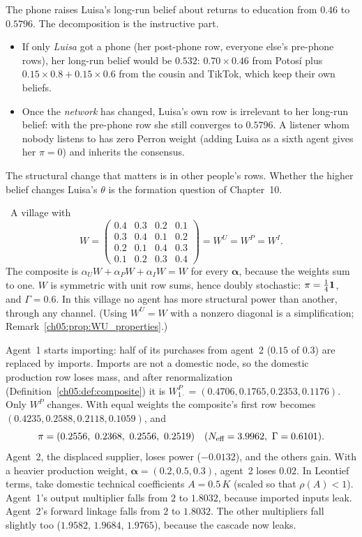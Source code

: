 \documentclass[../solutions_manual.tex]{subfiles}
\begin{document}
 The phone raises Luisa's long-run belief about returns to education from $0.46$ to $0.5796$. The decomposition is the instructive part.
\begin{itemize}
\item If only \emph{Luisa} got a phone (her post-phone row, everyone else's pre-phone rows), her long-run belief would be $0.532$: $0.70\times0.46$ from Potos\'i plus $0.15\times0.8 + 0.15\times0.6$ from the cousin and TikTok, which keep their own beliefs.
\item Once the \emph{network} has changed, Luisa's own row is irrelevant to her long-run belief: with the pre-phone row she still converges to $0.5796$. A listener whom nobody listens to has zero Perron weight (adding Luisa as a sixth agent gives her $\pi = 0$) and inherits the consensus.
\end{itemize}
The structural change that matters is in other people's rows. Whether the higher belief changes Luisa's $\theta$ is the formation question of Chapter~10.


 \illustrative\ A village with
\[
W = \begin{pmatrix} 0.4 & 0.3 & 0.2 & 0.1\\ 0.3 & 0.4 & 0.1 & 0.2\\ 0.2 & 0.1 & 0.4 & 0.3\\ 0.1 & 0.2 & 0.3 & 0.4\end{pmatrix} = W^U = W^P = W^I .
\]
The composite is $\alpha_UW + \alpha_PW + \alpha_IW = W$ for every $\boldsymbol\alpha$, because the weights sum to one. $W$ is symmetric with unit row sums, hence doubly stochastic: $\pi = \frac14\mathbf{1}$, and $\Gamma = 0.6$. In this village no agent has more structural power than another, through any channel. (Using $W^U = W$ with a nonzero diagonal is a simplification; Remark~\ref{ch05:prop:WU_properties}.)

 Agent~1 starts importing: half of its purchases from agent~2 ($0.15$ of $0.3$) are replaced by imports. Imports are not a domestic node, so the domestic production row loses mass, and after renormalization (Definition~\ref{ch05:def:composite}) it is $W^P_{1\cdot} = (0.4706, 0.1765, 0.2353, 0.1176)$. Only $W^P$ changes. With equal weights the composite's first row becomes $(0.4235, 0.2588, 0.2118, 0.1059)$, and
\[
\boldsymbol\pi = (0.2556,\ 0.2368,\ 0.2556,\ 0.2519)\quad(\Neff = 3.9962,\ \Gamma = 0.6101).
\]
Agent~2, the displaced supplier, loses power ($-0.0132$), and the others gain. With a heavier production weight, $\boldsymbol\alpha = (0.2, 0.5, 0.3)$, agent~2 loses $0.02$. In Leontief terms, take domestic technical coefficients $A = 0.5\,K$ (scaled so that $\rho(A) < 1$). Agent~1's output multiplier falls from $2$ to $1.8032$, because imported inputs leak. Agent~2's forward linkage falls from $2$ to $1.8032$. The other multipliers fall slightly too ($1.9582$, $1.9684$, $1.9765$), because the cascade now leaks.
\end{document}
